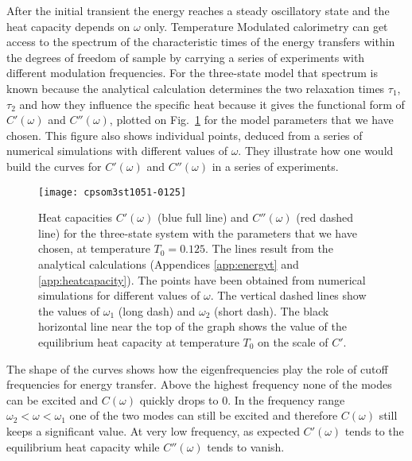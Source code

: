 \documentclass[pre,a4paper,twocolumn,superscriptaddress,%
floatfix]{revtex4}
\begin{document}
\medskip
After the initial transient the energy reaches a steady oscillatory state and
the heat capacity depends on $\omega$ only. Temperature Modulated
calorimetry can get access to the spectrum of the characteristic times
of the energy transfers
within the degrees of freedom of sample by carrying a series of experiments
with different modulation frequencies. For the three-state model
that spectrum is known because the
analytical calculation determines the two relaxation times $\tau_1$, $\tau_2$
and how they influence the specific heat because it gives the functional form
of $C'(\omega)$ and $C''(\omega)$, plotted on 
Fig.~\ref{fig:comeg} for the model parameters that we have chosen. This figure
also shows individual points, deduced from a series of numerical simulations
with different values of $\omega$. They illustrate how one would build the
curves for $C'(\omega)$ and $C''(\omega)$ in a series of experiments.
\begin{figure}[h]
  \centering
  \texttt{[image: cpsom3st1051-0125]}
  \caption{Heat capacities $C'(\omega)$ (blue full line) and $C''(\omega)$ (red
    dashed line) for the three-state system
    with the parameters that we have chosen,
    at temperature $T_0 = 0.125$. The lines result from the analytical
    calculations (Appendices \ref{app:energyt} and \ref{app:heatcapacity}). The
  points have been obtained from numerical simulations for different values of
$\omega$. The vertical dashed lines show the values of $\omega_1$ (long dash)
and $\omega_2$ (short dash). The black horizontal line
near the top of the graph shows the value of the
equilibrium heat capacity at temperature $T_0$ on the scale of $C'$.}
  \label{fig:comeg}
\end{figure}
The shape of the curves shows how the eigenfrequencies play the role
of cutoff frequencies for energy transfer. Above the highest frequency none of
the modes can be excited and $C(\omega)$ quickly drops to $0$. In the frequency
range $\omega_2 < \omega < \omega_1$ one of the two modes can still be excited
and therefore $C(\omega)$ still keeps a significant value. At very low
frequency, as expected $C'(\omega)$ tends to the equilibrium heat capacity
while $C''(\omega)$ tends to vanish.
\end{document}
